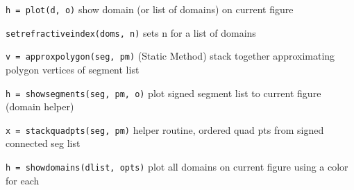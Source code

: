 {\tt h = plot(d, o)} show domain (or list of domains) on current figure

{\tt setrefractiveindex(doms, n)} sets n for a list of domains

{\tt v = approxpolygon(seg, pm)} (Static Method) stack together
approximating polygon vertices of segment list

{\tt h = showsegments(seg, pm, o)} plot signed segment list to
current figure (domain helper)

{\tt x = stackquadpts(seg, pm)} helper routine, ordered quad pts
from signed connected seg list 

{\tt h = showdomains(dlist, opts)} plot all domains on current
figure using a color for each




























